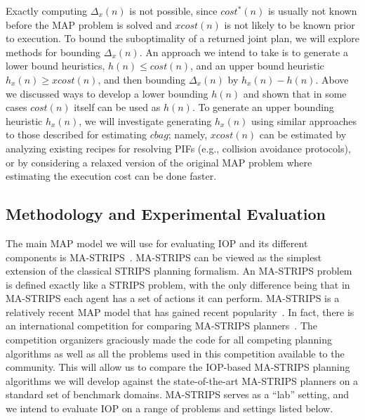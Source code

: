 \documentclass[11pt]{article}
\begin{document}


Exactly computing $\Delta_x(n)$ is not possible, since $cost^*(n)$ is usually not known before the MAP problem is solved and $xcost(n)$ is not likely to be known prior to execution. To bound the suboptimality of a returned joint plan, we will explore methods for bounding $\Delta_x(n)$. 
An approach we intend to take is to generate a lower bound heuristics, $h(n)\leq cost(n)$, and an upper bound heuristic $h_x(n)\geq xcost(n)$, and then bounding $\Delta_x(n)$ by $h_x(n)-h(n)$. 
Above we discussed ways to develop a lower bounding $h(n)$ and shown that in some cases $cost(n)$ itself can be used as $h(n)$. To generate an upper bounding heuristic $h_x(n)$, we will investigate generating $h_x(n)$ using similar approaches to those described for estimating $cbag$; namely, $xcost(n)$ can be estimated by analyzing existing recipes for resolving PIFs (e.g., collision avoidance protocols), or by considering a relaxed version of the original MAP problem where estimating the execution cost can be done faster. 



\subsection{Methodology and Experimental Evaluation}
\label{sec:methodology}
The main MAP model we will use for evaluating IOP and its different components is MA-STRIPS~\cite{brafman2013complexity}. MA-STRIPS can be viewed as the simplest extension of the classical STRIPS planning formalism. An MA-STRIPS problem is defined exactly like a STRIPS problem, with the only difference being that in MA-STRIPS each agent has a set of actions it can perform. MA-STRIPS is a relatively recent MAP model that has gained recent popularity~\cite{nissim2014distributed,vstolba2014relaxation,brafman2013complexity,zhang2014formal,komenda2013domain,torreno2014fmap,maliah2014privacyPreserving,maliah2015privacy,torreno2015global,jakubuv2015multiagent}.  In fact, there is an international competition for comparing MA-STRIPS planners~\cite{vstolba2015competition}. 
The competition organizers graciously made the code for all competing planning algorithms as well as all the problems used in this competition available to the community. This will allow us to compare the IOP-based MA-STRIPS planning algorithms we will develop against the state-of-the-art MA-STRIPS planners on a standard set of benchmark domains. MA-STRIPS serves as a ``lab'' setting, and we intend to evaluate IOP on a range of problems and settings listed below.
\end{document}
